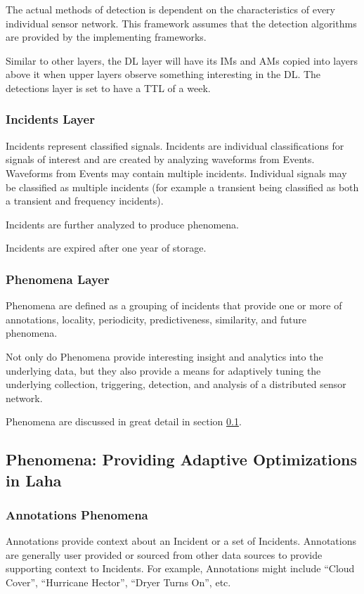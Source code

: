 The actual methods of detection is dependent on the characteristics of every individual sensor network. This framework assumes that the detection algorithms are provided by the implementing frameworks.

Similar to other layers, the DL layer will have its IMs and AMs copied into layers above it when upper layers observe something interesting in the DL. The detections layer is set to have a TTL of a week.

\subsubsection{Incidents Layer}
Incidents represent classified signals. Incidents are individual classifications for signals of interest and are created by analyzing waveforms from Events. Waveforms from Events may contain multiple incidents. Individual signals may be classified as multiple incidents (for example a transient being classified as both a transient and frequency incidents). 

Incidents are further analyzed to produce phenomena. 

Incidents are expired after one year of storage. 


\subsubsection{Phenomena Layer}
Phenomena are defined as a grouping of incidents that provide one or more of annotations, locality, periodicity, predictiveness, similarity, and future phenomena. 

Not only do Phenomena provide interesting insight and analytics into the underlying data, but they also provide a means for adaptively tuning the underlying collection, triggering, detection, and analysis of a distributed sensor network.

Phenomena are discussed in great detail in section \ref{phenomena}.

\subsection{Phenomena: Providing Adaptive Optimizations in Laha} \label{phenomena}

\subsubsection{Annotations Phenomena} \label{annotations-phenomena}
Annotations provide context about an Incident or a set of Incidents. Annotations are generally user provided or sourced from other data sources to provide supporting context to Incidents. For example, Annotations might include “Cloud Cover”, “Hurricane Hector”, “Dryer Turns On”, etc.

